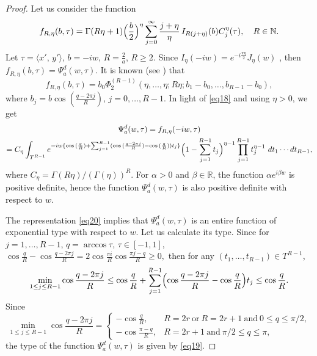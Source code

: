 \documentclass[12pt,twoside,reqno]{amsart}\usepackage[cp1251]{inputenc}
\theoremstyle{plain}
\theoremstyle{remark}
\begin{document}
\begin{proof} Let us consider the function
\[
 f_{R,\eta}(b,\tau)=\Gamma(R\eta+1)\Bigl(\frac{b}{2}\Bigr)^{\eta}\sum_{j=0}^{\infty}
 \frac{j+\eta}{\eta}\,I_{R(j+\eta)}(b)C_{j}^{\eta}(\tau), \quad R\in\mathbb{N}.
\]
Let $\tau=\langle x',\,y'\rangle$, $b=-iw$, $R=\frac{2}{a}$, $R\ge 2$. Since $I_{\eta}(-iw)=e^{-i\frac{\pi\eta}{2}}J_{\eta}(w)$ \cite[Chapt. 7, 7.2.2]{BE53a}, then $f_{R,\eta}(b,\tau)=\Psi_{a}^d(w,\tau)$. It is known (see \cite{BL20,DD21}) that
\[
f_{R,\eta}(b,\tau)=b_0\Phi_{2}^{(R-1)}(\eta,\dots,\eta;R\eta;b_1-b_0,\dots,b_{R-1}-b_0),
\]
where $b_j=b\cos{}(\frac{q-2\pi j}{R})$, $j=0,\dots,R-1$.
In light of \eqref{eq18} and using $\eta>0$, we get
\begin{multline}\label{eq20}
\Psi_{a}^d(w,\tau)=f_{R,\eta}(-iw,\tau)\\
=C_{\eta}\int_{T^{R-1}}e^{-iw\{\cos{}(\frac{q}{R})+\sum_{j=1}^{R-1}(\cos{}(\frac{q-2\pi j}{R})-\cos{}(\frac{q}{R}))t_j\}}\Bigl(1-\sum_{j=1}^{R-1}t_j\Bigr)^{\eta-1}\prod_{j=1}^{R-1}t_j^{\eta-1}\,
\,dt_1\cdots dt_{R-1},
\end{multline}
where $C_{\eta}=\Gamma(R\eta)/(\Gamma(\eta))^R$.
For $\alpha>0$ and $\beta\in\mathbb{R}$, the  function $\alpha e^{i\beta w}$ is positive definite, hence the function $\Psi_{a}^d(w,\tau)$ is also positive definite  with respect to $w$.


The representation \eqref{eq20} implies  that $\Psi_a^d(w,\tau)$ is an entire function of exponential type
with respect to $w$. Let us calculate its type. Since for $j=1,\dots,R-1$, $q=\arccos\tau$, $\tau\in [-1,1]$,
$%
\cos\frac{q}{R}-\cos\frac{q-2\pi j}{R}=2\cos\frac{\pi i}{R}\cos\frac{\pi j-q}{R}\ge 0,
$ %
 then for any $(t_1,\dots,t_{R-1})\in T^{R-1}$,
\[
\min_{1\le j\le R-1}\cos\frac{q-2\pi j}{R}\le \cos\frac{q}{R}+\sum_{j=1}^{R-1}\Bigl(\cos\frac{q-2\pi j}{R}-\cos\frac{q}{R}\Bigr)t_j\le \cos\frac{q}{R}.
\]
Since
\begin{equation*}
\min_{1\le j\le R-1}\cos\frac{q-2\pi j}{R}=
\begin{cases}-\cos\frac{q}{R}, & R=2r\ \text{or}\ R=2r+1\ \text{and}\ 0\le q\le\pi/2,\\
-\cos\frac{\pi-q}{R}, & R=2r+1\ \text{and}\ \pi/2\le q\le\pi,
\end{cases}
\end{equation*}
the type of the function $\Psi_{a}^d(w,\tau)$ is given by \eqref{eq19}.
\end{proof}
\end{document}
